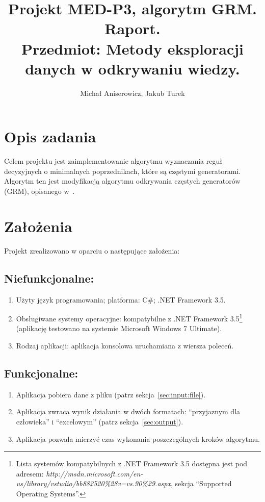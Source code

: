 \documentclass[a4paper,10pt]{article}
\title{Projekt MED-P3, algorytm GRM. Raport. \\ \small{Przedmiot: Metody eksploracji danych w odkrywaniu wiedzy.}}
\author{Michał Aniserowicz, Jakub Turek}
\date{}
\begin{document}
\maketitle

\section{Opis zadania} \label{sec:task_desc}
Celem projektu jest zaimplementowanie algorytmu wyznaczania reguł decyzyjnych o minimalnych poprzednikach, które są częstymi generatorami.
Algorytm ten jest modyfikacją algorytmu odkrywania częstych generatorów (GRM), opisanego w~\cite{grm}.



\section{Założenia} \label{sec:assumptions}
Projekt zrealizowano w oparciu o następujące założenia:

 \subsection{Niefunkcjonalne:}
  \begin{enumerate}
   \item Użyty język programowania; platforma: C\#; .NET Framework 3.5.
   \item Obsługiwane systemy operacyjne: kompatybilne z .NET Framework 3.5\footnote{Lista systemów kompatybilnych z .NET Framework 3.5 dostępna jest pod adresem: \emph{http://msdn.microsoft.com/en-us/library/vstudio/bb882520\%28v=vs.90\%29.aspx}, sekcja ``Supported Operating Systems''.} (aplikację testowano na systemie Microsoft Windows 7 Ultimate).
   \item Rodzaj aplikacji: aplikacja konsolowa uruchamiana z wiersza poleceń.
 \end{enumerate}


 \subsection{Funkcjonalne:}
  \begin{enumerate}
   \item Aplikacja pobiera dane z pliku (patrz sekcja~\ref{sec:input:file}).
   \item Aplikacja zwraca wynik działania w dwóch formatach: ``przyjaznym dla człowieka'' i ``excelowym'' (patrz sekcja~\ref{sec:output}).
   \item Aplikacja pozwala mierzyć czas wykonania poszczególnych kroków algorytmu.
  \end{enumerate}
\end{document}

